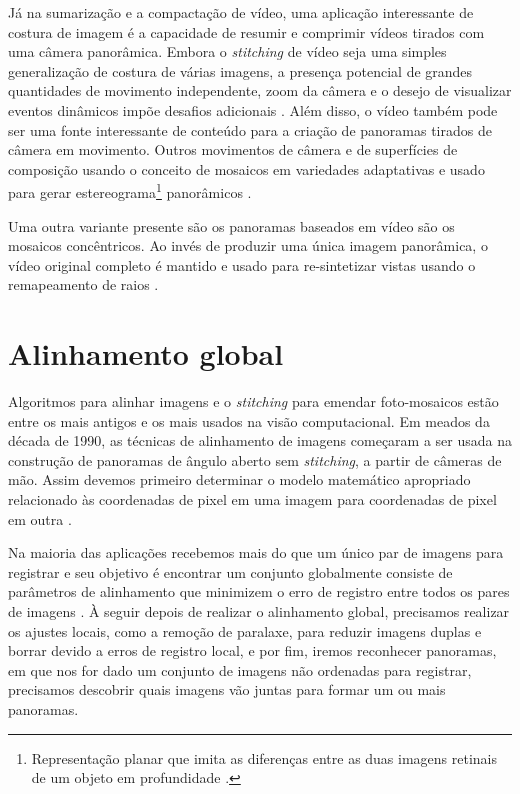 \documentclass{article}
\begin{document}
Já na sumarização e a compactação de vídeo, uma aplicação interessante de costura de imagem é a capacidade de resumir e comprimir vídeos tirados com uma câmera panorâmica. Embora o \textit{stitching} de vídeo seja uma simples generalização de costura de várias imagens, a presença potencial de grandes quantidades de movimento independente, zoom da câmera e o desejo de visualizar eventos dinâmicos impõe desafios adicionais \cite{szeliski:2010}. Além disso, o vídeo também pode ser uma fonte interessante de conteúdo para a criação de panoramas tirados de câmera em movimento. Outros movimentos de câmera e de superfícies de composição usando o conceito de mosaicos em variedades adaptativas e usado para gerar estereograma\footnote{Representação planar que imita as diferenças entre as duas imagens retinais de um objeto em profundidade \cite{gomes:2015}.} panorâmicos \cite{szeliski:2010}.

Uma outra variante presente são os panoramas baseados em vídeo são os mosaicos concêntricos. Ao invés de produzir uma única imagem panorâmica, o vídeo original completo é mantido e usado para re-sintetizar vistas usando o remapeamento de raios \cite{szeliski:2010}.

\section{Alinhamento global}
Algoritmos para alinhar imagens e o \textit{stitching} para emendar foto-mosaicos estão entre os mais antigos e os mais usados na visão computacional. Em meados da década de 1990, as técnicas de alinhamento de imagens começaram a ser usada na construção de panoramas de ângulo aberto sem \textit{stitching}, a partir de câmeras de mão. Assim devemos primeiro determinar o modelo matemático apropriado relacionado às coordenadas de pixel em uma imagem para coordenadas de pixel em outra \cite{szeliski:2010}.

Na maioria das aplicações recebemos mais do que um único par de imagens para registrar e seu objetivo é encontrar um conjunto globalmente consiste de parâmetros de alinhamento que minimizem o erro de registro entre todos os pares de imagens \cite{szeliski:2010}. À seguir depois de realizar o alinhamento global, precisamos realizar os ajustes locais, como a remoção de paralaxe, para reduzir imagens duplas e borrar devido a erros de registro local, e por fim, iremos reconhecer panoramas, em que nos for dado um conjunto de imagens não ordenadas para registrar, precisamos descobrir quais imagens vão juntas para formar um ou mais panoramas.
\end{document}
